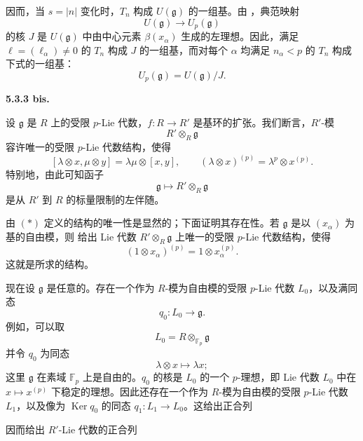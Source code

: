 因而，当 \(s=|n|\) 变化时，\(T_n\) 构成 \(U(\mathfrak g)\) 的一组基。由 ，典范映射
\[
  U(\mathfrak g)\longrightarrow U_p(\mathfrak g)
\]
的核 \(J\) 是 \(U(\mathfrak g)\) 中由中心元素 \(\beta(x_\alpha)\) 生成的左理想。因此，满足 \(\ell=(\ell_\alpha)\ne0\) 的 \(T_n\) 构成 \(J\) 的一组基，而对每个 \(\alpha\) 均满足 \(n_\alpha<p\) 的 \(T_n\) 构成下式的一组基：
\[
  U_p(\mathfrak g)=U(\mathfrak g)/J.
\]

\medskip
\noindent\textbf{5.3.3 bis.}
\label{sga3:VIIA:5.3.3bis}

设 \(\mathfrak g\) 是 \(R\) 上的受限 \(p\)-Lie 代数，\(f:R\to R'\) 是基环的扩张。我们断言，\(R'\)-模
\[
  R'\otimes_R\mathfrak g
\]
容许唯一的受限 \(p\)-Lie 代数结构，使得
\[
  \tag{*}\label{sga3:vii:paragraph:5-3-3-bis:equation:star}
  [\lambda\otimes x,\mu\otimes y]
  =
  \lambda\mu\otimes[x,y],
  \qquad
  (\lambda\otimes x)^{(p)}
  =
  \lambda^p\otimes x^{(p)}.
\]
特别地，由此可知函子
\[
  \mathfrak g\longmapsto R'\otimes_R\mathfrak g
\]
是从 \(R'\) 到 \(R\) 的标量限制的左伴随。

由 \((*)\) 定义的结构的唯一性是显然的；下面证明其存在性。若 \(\mathfrak g\) 是以 \((x_\alpha)\) 为基的自由模，则  给出 Lie 代数 \(R'\otimes_R\mathfrak g\) 上唯一的受限 \(p\)-Lie 代数结构，使得
\[
  (1\otimes x_\alpha)^{(p)}
  =
  1\otimes x_\alpha^{(p)}.
\]
这就是所求的结构。

现在设 \(\mathfrak g\) 是任意的。存在一个作为 \(R\)-模为自由模的受限 \(p\)-Lie 代数 \(L_0\)，以及满同态
\[
  q_0:L_0\longrightarrow\mathfrak g.
\]
例如，可以取
\[
  L_0=R\otimes_{\mathbb F_p}\mathfrak g
\]
并令 \(q_0\) 为同态
\[
  \lambda\otimes x\longmapsto\lambda x;
\]
这里 \(\mathfrak g\) 在素域 \(\mathbb F_p\) 上是自由的。\(q_0\) 的核是 \(L_0\) 的一个 \(p\)-理想，即 Lie 代数 \(L_0\) 中在 \(x\mapsto x^{(p)}\) 下稳定的理想。因此还存在一个作为 \(R\)-模为自由模的受限 \(p\)-Lie 代数 \(L_1\)，以及像为 \(\operatorname{Ker}q_0\) 的同态 \(q_1:L_1\to L_0\)。这给出正合列
\begin{center}
  \label{sga3:VIIA:5.3.3bis-exact-sequence}
  
\end{center}
因而给出 \(R'\)-Lie 代数的正合列
\begin{center}
  \label{sga3:VIIA:5.3.3bis-basechange-exact-sequence}
  
\end{center}

